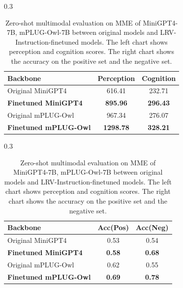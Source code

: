 \vspace{-0.1in}
\begin{table}[t]
\begin{subtable}[t]{0.3\textwidth}
\small
\begin{tabular}{lcc}
\toprule[1.5pt]
Backbone & Perception & Cognition\\
\midrule
Original MiniGPT4 & 616.41 & 232.71 \\
\textbf{Finetuned MiniGPT4} & \textbf{895.96} & \textbf{296.43} \\
Original mPLUG-Owl & 967.34 & 276.07 \\
\textbf{Finetuned mPLUG-Owl} & \textbf{1298.78} & \textbf{328.21} \\
\bottomrule[1.5pt]
\end{tabular}
\label{tab:stat1}
\end{subtable}
\hspace{1.2in}
\begin{subtable}[t]{0.3\textwidth}
\setlength\tabcolsep{4.7pt}
\centering
\small
\begin{tabular}{lcc}
\toprule[1.5pt]
Backbone & Acc(Pos) & Acc(Neg)\\
\midrule
Original MiniGPT4 & 0.53 & 0.54 \\
\textbf{Finetuned MiniGPT4} & \textbf{0.58} & \textbf{0.68} \\
Original mPLUG-Owl & 0.62 & 0.55 \\
\textbf{Finetuned mPLUG-Owl} & \textbf{0.69} & \textbf{0.78} \\
\bottomrule[1.5pt]
\end{tabular}
\label{tab:stat2}
\end{subtable}
\vspace{2mm}
\caption{Zero-shot multimodal evaluation on MME \citep{fu2023mme} of MiniGPT4-7B, mPLUG-Owl-7B between original models and LRV-Instruction-finetuned models. The left chart shows perception and cognition scores. The right chart shows the accuracy on the positive set and the negative set.
}
\label{tab:MME}
\vspace{-0.05in}
\end{table}

